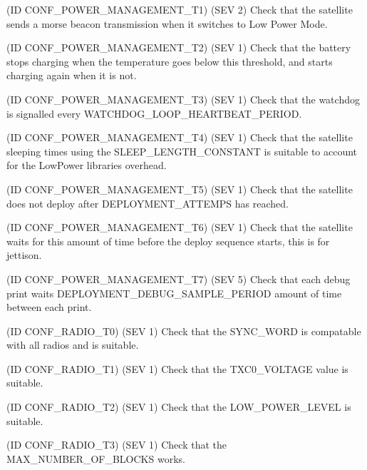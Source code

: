 \begin{DoxyRefList}
(ID C\+O\+N\+F\+\_\+\+P\+O\+W\+E\+R\+\_\+\+M\+A\+N\+A\+G\+E\+M\+E\+N\+T\+\_\+\+T1) (S\+EV 2) Check that the satellite sends a morse beacon transmission when it switches to Low Power Mode. 

(ID C\+O\+N\+F\+\_\+\+P\+O\+W\+E\+R\+\_\+\+M\+A\+N\+A\+G\+E\+M\+E\+N\+T\+\_\+\+T2) (S\+EV 1) Check that the battery stops charging when the temperature goes below this threshold, and starts charging again when it is not. 

(ID C\+O\+N\+F\+\_\+\+P\+O\+W\+E\+R\+\_\+\+M\+A\+N\+A\+G\+E\+M\+E\+N\+T\+\_\+\+T3) (S\+EV 1) Check that the watchdog is signalled every W\+A\+T\+C\+H\+D\+O\+G\+\_\+\+L\+O\+O\+P\+\_\+\+H\+E\+A\+R\+T\+B\+E\+A\+T\+\_\+\+P\+E\+R\+I\+OD. 

(ID C\+O\+N\+F\+\_\+\+P\+O\+W\+E\+R\+\_\+\+M\+A\+N\+A\+G\+E\+M\+E\+N\+T\+\_\+\+T4) (S\+EV 1) Check that the satellite sleeping times using the S\+L\+E\+E\+P\+\_\+\+L\+E\+N\+G\+T\+H\+\_\+\+C\+O\+N\+S\+T\+A\+NT is suitable to account for the Low\+Power libraries overhead. 

(ID C\+O\+N\+F\+\_\+\+P\+O\+W\+E\+R\+\_\+\+M\+A\+N\+A\+G\+E\+M\+E\+N\+T\+\_\+\+T5) (S\+EV 1) Check that the satellite does not deploy after D\+E\+P\+L\+O\+Y\+M\+E\+N\+T\+\_\+\+A\+T\+T\+E\+M\+PS has reached. 

(ID C\+O\+N\+F\+\_\+\+P\+O\+W\+E\+R\+\_\+\+M\+A\+N\+A\+G\+E\+M\+E\+N\+T\+\_\+\+T6) (S\+EV 1) Check that the satellite waits for this amount of time before the deploy sequence starts, this is for jettison. 

(ID C\+O\+N\+F\+\_\+\+P\+O\+W\+E\+R\+\_\+\+M\+A\+N\+A\+G\+E\+M\+E\+N\+T\+\_\+\+T7) (S\+EV 5) Check that each debug print waits D\+E\+P\+L\+O\+Y\+M\+E\+N\+T\+\_\+\+D\+E\+B\+U\+G\+\_\+\+S\+A\+M\+P\+L\+E\+\_\+\+P\+E\+R\+I\+OD amount of time between each print. 
\item[\label{test__test000025}%
\Hypertarget{test__test000025}%
Module \hyperlink{group__defines__radio__common__configuraiton}{defines\+\_\+radio\+\_\+common\+\_\+configuraiton} ](ID C\+O\+N\+F\+\_\+\+R\+A\+D\+I\+O\+\_\+\+T0) (S\+EV 1) Check that the S\+Y\+N\+C\+\_\+\+W\+O\+RD is compatable with all radios and is suitable. 

(ID C\+O\+N\+F\+\_\+\+R\+A\+D\+I\+O\+\_\+\+T1) (S\+EV 1) Check that the T\+X\+C0\+\_\+\+V\+O\+L\+T\+A\+GE value is suitable. 

(ID C\+O\+N\+F\+\_\+\+R\+A\+D\+I\+O\+\_\+\+T2) (S\+EV 1) Check that the L\+O\+W\+\_\+\+P\+O\+W\+E\+R\+\_\+\+L\+E\+V\+EL is suitable. 

(ID C\+O\+N\+F\+\_\+\+R\+A\+D\+I\+O\+\_\+\+T3) (S\+EV 1) Check that the M\+A\+X\+\_\+\+N\+U\+M\+B\+E\+R\+\_\+\+O\+F\+\_\+\+B\+L\+O\+C\+KS works. 


\end{DoxyRefList}
